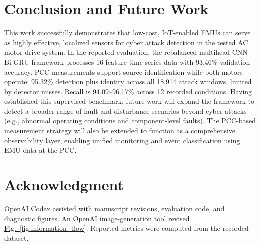 \documentclass[conference,letterpaper]{IEEEtran}
\providecommand{\DIFadd}[1]{{\protect\color{blue}\uline{#1}}} %
\providecommand{\DIFaddbegin}{} %
\providecommand{\DIFaddend}{} %
\begin{document}
\section{Conclusion and Future Work}

This work successfully demonstrates that low-cost, IoT-enabled EMUs can serve as highly effective, localized sensors for cyber attack detection in the tested AC motor-drive system. In the reported evaluation, the rebalanced multihead CNN--Bi-GRU framework processes 16-feature time-series data with 93.46\% validation accuracy. PCC measurements support source identification while both motors operate: 95.32\% detection plus identity across all 18,914 attack windows, limited by detector misses. Recall is 94.09--96.17\% across 12 recorded conditions. Having established this supervised benchmark, future work will expand the framework to detect a broader range of fault and disturbance scenarios beyond cyber attacks (e.g., abnormal operating conditions and component-level faults). The PCC-based measurement strategy will also be extended  to function as a comprehensive observability layer, enabling unified monitoring and event classification using EMU data at the PCC.

\section*{Acknowledgment}
OpenAI Codex assisted with manuscript revisions, evaluation code, and diagnostic figures\DIFaddbegin \DIFadd{. An OpenAI image-generation tool revised Fig.~\ref{fig:information_flow}}\DIFaddend . Reported metrics were computed from the recorded dataset.



\end{document}
